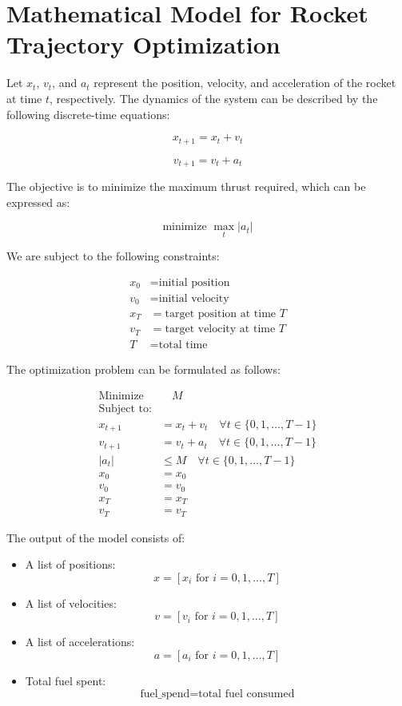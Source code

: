 \documentclass{article}
\begin{document}
\section*{Mathematical Model for Rocket Trajectory Optimization}

Let \( x_t \), \( v_t \), and \( a_t \) represent the position, velocity, and acceleration of the rocket at time \( t \), respectively. The dynamics of the system can be described by the following discrete-time equations:

\[
x_{t+1} = x_t + v_t
\]

\[
v_{t+1} = v_t + a_t
\]

The objective is to minimize the maximum thrust required, which can be expressed as:

\[
\text{minimize } \max_{t} |a_t|
\]

We are subject to the following constraints:

\begin{align*}
x_0 & = \text{initial position} \\
v_0 & = \text{initial velocity} \\
x_T & = \text{target position at time } T \\
v_T & = \text{target velocity at time } T \\
T   & = \text{total time}
\end{align*}

The optimization problem can be formulated as follows:

\begin{align*}
\text{Minimize} & \quad M \\
\text{Subject to:} & \\
x_{t+1} & = x_t + v_t \quad \forall t \in \{0, 1, \ldots, T-1\} \\
v_{t+1} & = v_t + a_t \quad \forall t \in \{0, 1, \ldots, T-1\} \\
|a_t| & \leq M \quad \forall t \in \{0, 1, \ldots, T-1\} \\
x_0 & = x_0 \\
v_0 & = v_0 \\
x_T & = x_T \\
v_T & = v_T
\end{align*}

The output of the model consists of:

\begin{itemize}
    \item A list of positions:
    \[
    x = [x_i \text{ for } i = 0, 1, \ldots, T]
    \]
    \item A list of velocities:
    \[
    v = [v_i \text{ for } i = 0, 1, \ldots, T]
    \]
    \item A list of accelerations:
    \[
    a = [a_i \text{ for } i = 0, 1, \ldots, T]
    \]
    \item Total fuel spent:
    \[
    \text{fuel\_spend} = \text{total fuel consumed}
    \]
\end{itemize}
\end{document}
